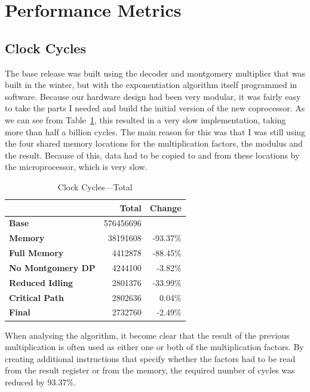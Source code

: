 \documentclass[a4paper]{article}
\begin{document}
\section{Performance Metrics}

\subsection{Clock Cycles}

The base release was built using the decoder and montgomery multiplier that was built in the winter, but with the exponentiation algorithm itself programmed in software. Because our hardware design had been very modular, it was fairly easy to take the parts I needed and build the initial version of the new coprocessor. As we can see from Table~\ref{tab:clock_cycles_total}, this resulted in a very slow implementation, taking more than half a billion cycles. The main reason for this was that I was still using the four shared memory locations for the multiplication factors, the modulus and the result. Because of this, data had to be copied to and from these locations by the microprocessor, which is very slow.\\

\begin{table}[H]
    \begin{center}	
        \begin{tabular}{l|r|r}
            & \textbf{Total} & \textbf{Change}\\\hline
            \textbf{Base} & 576456696 & \\
            \textbf{Memory} & 38191608 & -93.37\%\\
            \textbf{Full Memory} & 4412878 & -88.45\%\\
            \textbf{No Montgomery DP} & 4244100 & -3.82\%\\
            \textbf{Reduced Idling} & 2801376 & -33.99\%\\
            \textbf{Critical Path} & 2802636 & 0.04\%\\
            \textbf{Final} & 2732760 & -2.49\%
		\end{tabular}
	\end{center}
	\caption{Clock Cycles---Total}
	\label{tab:clock_cycles_total}
\end{table}

When analysing the algorithm, it become clear that the result of the previous multiplication is often used as either one or both of the multiplication factors. By creating additional instructions that specify whether the factors had to be read from the result register or from the memory, the required number of cycles was reduced by 93.37\%.\\
\end{document}
